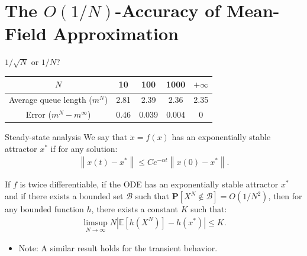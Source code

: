 \documentclass{beamer}
\newcommand\esp[1]{\mathbb{E}\left[#1\right]}
\newcommand\calB{\mathcal{B}}
\newcommand\Proba[1]{\mathbf{P}\left[#1\right]}
\newcommand\norm[1]{\left\|#1\right\|}
\newcommand\abs[1]{\left|#1\right|}
\newcommand\bX{\mathbf{X}}
\begin{document}
\section{The $O(1/N)$-Accuracy of Mean-Field Approximation}

\begin{frame}{$1/\sqrt{N}$ or $1/N$?}


  \begin{center}
    \begin{tabular}{|c|c|c|c|c|}
      \hline
      $N$ & 10 & 100 & 1000 &$+\infty$\\\hline
      Average queue length ($m^N$) &2.81&2.39&2.36& 2.35\\\hline
      Error ($m^N-m^\infty$) & 0.46 & 0.039 & 0.004 & 0 \\\hline
    \end{tabular}
  \end{center}
\end{frame}




\begin{frame}{Steady-state analysis}
  We say that $\dot{x}=f(x)$ has an exponentially stable attractor
  $x^*$ if for any solution: 
  \begin{align*}
    \norm{x(t)-x^*} \le C e^{-\alpha t}\norm{x(0)-x^*}.  
  \end{align*}
  
  \pause
  \begin{theorem}
    If $f$ is twice differentiable, if the ODE has an exponentially
    stable attractor $x^*$ and if there exists a bounded set $\calB$
    such that $\Proba{X^N\not\in \calB}=O(1/N^2)$, then for any
    bounded function $h$, there exists a constant $K$ such that:
    \begin{align*}
      \limsup_{N\to\infty}N\abs{\esp{h(X^N)} - h(x^*)} \le 
      K.
    \end{align*}
  \end{theorem}
  \begin{itemize}
  \item Note: A similar result holds for the transient behavior.
  \end{itemize}

\end{frame}
\end{document}
